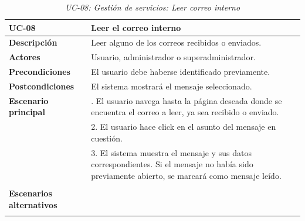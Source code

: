 \begin{table}
  \begin{center}
    \begin{tabularx}{16.4cm}{|l|X|}
      \hline
      \textbf{UC-08} & \textbf{Leer el correo interno}\\
      \hline
      \textbf{Descripción} & Leer alguno de los correos recibidos o enviados.\\
      \hline
      \textbf{Actores} & Usuario, administrador o superadministrador.\\
      \hline
      \textbf{Precondiciones} & El usuario debe haberse identificado previamente.\\
      \hline
      \textbf{Postcondiciones} & El sistema mostrará el mensaje seleccionado.\\
      \hline
      \textbf{Escenario principal} & \smallskip 1. El usuario navega hasta la página deseada donde se encuentra el correo a leer, ya sea recibido o enviado.\\
      & 2. El usuario hace click en el asunto del mensaje en cuestión.\\
      & 3. El sistema muestra el mensaje y sus datos correspondientes. Si el mensaje no había sido previamente abierto, se marcará como mensaje leído.\\
      & \\
      \hline
      \textbf{Escenarios alternativos} & \\
      & \\
      \hline
    \end{tabularx}
    \caption{\textit{UC-08: Gestión de servicios: Leer correo interno}}
    \label{tab:CU-leer-correo}
  \end{center}
\end{table}


